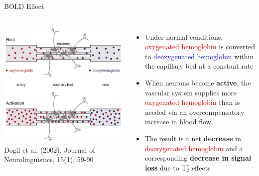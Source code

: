 \documentclass[aspectratio=169,xcolor=dvipsnames]{beamer}
\begin{document}
\begin{frame}{BOLD Effect}
\begin{columns}[c]
\includegraphics[width=1\textwidth]{imgs/BOLDeffect}
\tiny{Dogil et al. (2002). Journal of Neurolinguistics, 15(1), 59-90}
\begin{itemize}
\item<1-> Under normal conditions, \textcolor{red}{oxygenated hemoglobin} is converted to \textcolor{blue}{deoxygenated hemoglobin} within the capillary bed at a constant rate
\item<2-> When neurons become \textbf{active}, the vascular system supplies more \textcolor{red}{oxygenated hemoglobin} than is needed via an overcompensatory increase in blood flow.
\item<3-> The result is a net \textbf{decrease} in \textcolor{red}{deoxygenated hemoglobin} and a corresponding \textbf{decrease in signal loss} due to T$_{2}^{*}$ effects
\end{itemize}
\end{columns}
\end{frame}

\end{document}

